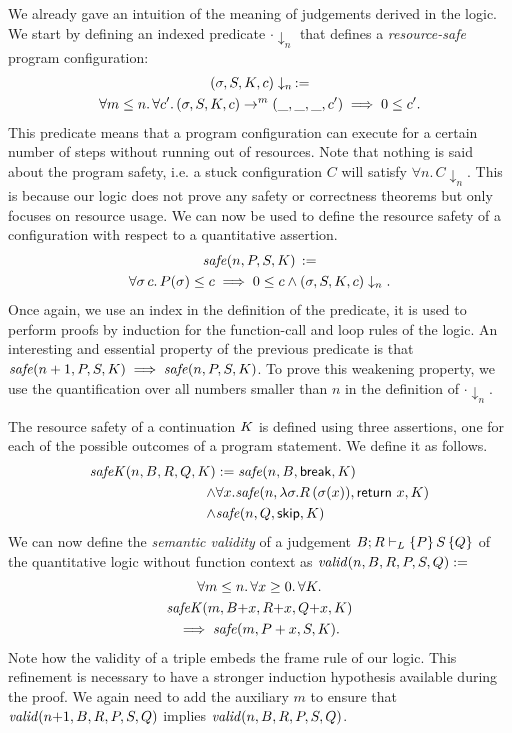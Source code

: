 \documentclass[nocopyrightspace,preprint,pldi]{sigplanconf-pldi15}
\begin{document}
{We already gave an intuition of the meaning of judgements
derived in the logic.  We start by defining an indexed
predicate $\cdot \downarrow_n$ that defines a \emph{resource-safe}
program configuration:
\begin{multline*}
  (\sigma, S, K, c) \downarrow_n \, := \\
  \forall m \le n.\, \forall c'.\,
    (\sigma, S, K, c) \to^m
    (\_, \_, \_, c') \implies 0 \le c'.
\end{multline*}
This predicate means that a program configuration can execute
for a certain number of steps without running out of resources.
Note that nothing is said about the program safety, i.e. a stuck
configuration $C$ will satisfy $\forall n.\, C\downarrow_n$. This
is because our logic does not prove any safety or correctness
theorems but only focuses on resource usage.
We can now be used to define the resource safety
of a configuration with respect to a quantitative assertion.
\begin{multline*}
  \mathit{safe}(n,P,S,K) \, := \\
  \forall \sigma\, c.\, P(\sigma) \le c \implies
    0 \le c \wedge (\sigma, S, K, c) \downarrow_n.
\end{multline*}
Once again, we use an index in the definition of the predicate, it
is used to perform proofs by induction for the function-call and
loop rules of the logic.
%
An interesting and essential property of the previous predicate is
that $\mathit{safe}(n+1,P,S,K) \implies \mathit{safe}(n,P,S,K)$.  To prove
this weakening property, we use the quantification over all numbers
smaller than $n$ in the definition of $\cdot \downarrow_n$.

The resource safety of a continuation $K$ is defined using three
assertions, one for each of the possible outcomes of a program
statement.  We define it as follows.
\begin{align*}
\mathit{safeK}(n,B,R,Q,K) & :=  \mathit{safe}(n,B,\mathsf{break},K) \\
 \land& \forall x. \mathit{safe}(n,\lambda \sigma.R\,(\sigma(x)),\mathsf{return}~x,K) \\
 \land& \mathit{safe}(n,Q,\mathsf{skip},K)
\end{align*}
%
We can now define the \emph{semantic validity} of a judgement $B; R
\vdash_L \{P\}\, S\, \{Q\}$ of the quantitative logic without function
context as $\mathit{valid}(n,B,R,P,S,Q) :=$
\begin{multline*}
\forall m \le n.\, \forall x \geq 0 .\, \forall K . \\
  \mathit{safeK}(m,B{+}x,R{+}x,Q{+}x,K) \\
  \implies \mathit{safe}(m,P+x,S,K) .
\end{multline*}
Note how the validity of a triple embeds the frame rule of
our logic. This refinement is necessary to have a stronger
induction hypothesis available during the proof.
%
We again need to add the auxiliary $m$ to ensure that $\mathit{valid}(n{+}1,B,R,P,S,Q)$ implies $\mathit{valid}(n,B,R,P,S,Q)$.

}
\end{document}

